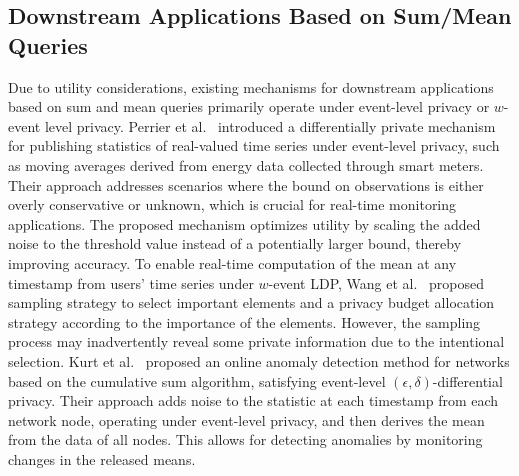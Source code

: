 \subsection{Downstream Applications Based on Sum/Mean Queries}
Due to utility considerations, existing mechanisms for downstream applications based on sum and mean queries primarily operate under event-level privacy or $w$-event level privacy.
Perrier et al.~\cite{perrier2018private} introduced a differentially private mechanism for publishing statistics of real-valued time series under event-level privacy, such as moving averages derived from energy data collected through smart meters. Their approach addresses scenarios where the bound on observations is either overly conservative or unknown, which is crucial for real-time monitoring applications. The proposed mechanism optimizes utility by scaling the added noise to the threshold value instead of a potentially larger bound, thereby improving accuracy.
To enable real-time computation of the mean at any timestamp from users' time series under $w$-event LDP, Wang et al.~\cite{wang2020towards} proposed sampling strategy to select important elements and a privacy budget allocation strategy according to the importance of the elements. However, the sampling process may inadvertently reveal some private information due to the intentional selection.
Kurt et al.~\cite{kurt2022online} proposed an online anomaly detection method for networks based on the cumulative sum algorithm, satisfying event-level $(\epsilon, \delta)$-differential privacy. Their approach adds noise to the statistic at each timestamp from each network node, operating under event-level privacy, and then derives the mean from the data of all nodes. This allows for detecting anomalies by monitoring changes in the released means.











